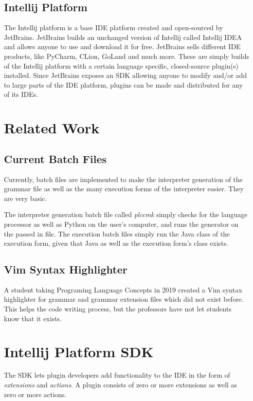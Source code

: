 \documentclass[conference, letterpaper]{IEEEtran}
\begin{document}
\subsection{Intellij Platform}\label{subsec:intellij-platform-sdk}
The Intellij platform is a base IDE platform created and open-sourced by JetBrains.
JetBrains builds an unchanged version of Intellij called Intellij IDEA and allows anyone to use and download it for free.
JetBrains sells different IDE products, like PyCharm, CLion, GoLand and much more.
These are simply builds of the Intellij platform with a certain language specific, closed-source plugin(s) installed.
Since JetBrains exposes an SDK allowing anyone to modify and/or add to large parts of the IDE platform, plugins can be made and distributed for any of its IDEs.


\section{Related Work}\label{sec:related-work}
\subsection{Current Batch Files}\label{subsec:current-batch-files}
Currently, batch files are implemented to make the interpreter generation of the grammar file as well as the many execution forms of the interpreter easier.
They are very basic.

The interpreter generation batch file called \textit{plccmk} simply checks for the language processor as well as Python on the user's computer, and runs the generator on the passed in file.
The execution batch files simply run the Java class of the execution form, given that Java as well as the execution form's class exists.

\subsection{Vim Syntax Highlighter}\label{subsec:vim-highlighter-attempt}
A student taking Programing Language Concepts in 2019 created a Vim syntax highlighter for grammar and grammar extension files which did not exist before.
This helps the code writing process, but the professors have not let students know that it exists.


\section{Intellij Platform SDK}\label{sec:intellij-platform-sdk}
The SDK lets plugin developers add functionality to the IDE in the form of \textit{extensions} and \textit{actions}.
A plugin consists of zero or more extensions as well as zero or more actions.
\end{document}

